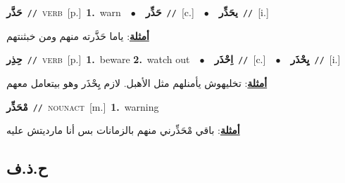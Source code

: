 \documentclass[10pt,a4paper,twoside]{article} %
\begin{document}
\begin{multicols}{2}
{\setlength\topsep{0pt}\textbf{\foreignlanguage{arabic}{حَذَّر}}\ {\color{gray}\texttt{//}\color{black}}\ \textsc{verb}\ [p.]\ \textbf{1.}~warn\ \ $\bullet$\ \ \setlength\topsep{0pt}\textbf{\foreignlanguage{arabic}{حَذِّر}}\ {\color{gray}\texttt{//}\color{black}}\ [c.]\ \ $\bullet$\ \ \setlength\topsep{0pt}\textbf{\foreignlanguage{arabic}{يحَذِّر}}\ {\color{gray}\texttt{//}\color{black}}\ [i.]\  \begin{flushright}\color{gray}\foreignlanguage{arabic}{\textbf{\underline{\foreignlanguage{arabic}{أمثلة}}}: ياما حَذَّرته منهم ومن خبثنتهم}\end{flushright}\color{black}} \vspace{2mm}

{\setlength\topsep{0pt}\textbf{\foreignlanguage{arabic}{حِذِر}}\ {\color{gray}\texttt{//}\color{black}}\ \textsc{verb}\ [p.]\ \textbf{1.}~beware  \textbf{2.}~watch out\ \ $\bullet$\ \ \setlength\topsep{0pt}\textbf{\foreignlanguage{arabic}{اِحْذَر}}\ {\color{gray}\texttt{//}\color{black}}\ [c.]\ \ $\bullet$\ \ \setlength\topsep{0pt}\textbf{\foreignlanguage{arabic}{يِحْذَر}}\ {\color{gray}\texttt{//}\color{black}}\ [i.]\  \begin{flushright}\color{gray}\foreignlanguage{arabic}{\textbf{\underline{\foreignlanguage{arabic}{أمثلة}}}: تخليهوش يأمنلهم مثل الأهبل. لازم يِحْذَر وهو بيتعامل معهم}\end{flushright}\color{black}} \vspace{2mm}

{\setlength\topsep{0pt}\textbf{\foreignlanguage{arabic}{مْحَذِّر}}\ {\color{gray}\texttt{//}\color{black}}\ \textsc{noun\textunderscore act}\ [m.]\ \textbf{1.}~warning\  \begin{flushright}\color{gray}\foreignlanguage{arabic}{\textbf{\underline{\foreignlanguage{arabic}{أمثلة}}}: باقي مْحَذِّرني منهم بالزمانات بس أنا مارديتش عليه}\end{flushright}\color{black}} \vspace{2mm}

\vspace{-3mm}
\subsection*{\color{blue}\foreignlanguage{arabic}{ح.ذ.ف}\color{blue}{}} 


\end{multicols}
\end{document}
